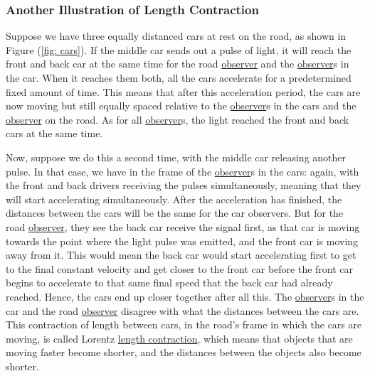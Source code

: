 \subsubsection{Another Illustration of Length Contraction}

Suppose we have three equally distanced cars at rest on the road, as shown in Figure (\ref{fig: cars}).
If the middle car sends out a pulse of light, it will reach the front and back car at the same time for the road \hyperlink{def-observer}{observer} and the \hyperlink{def-observer}{observer}s in the car. When it reaches them both, all the cars accelerate for a predetermined fixed amount of time.
This means that after this acceleration period, the cars are now moving but still equally spaced relative to the \hyperlink{def-observer}{observer}s in the cars and the \hyperlink{def-observer}{observer} on the road.
As for all \hyperlink{def-observer}{observer}s, the light reached the front and back cars at the same time.

Now, suppose we do this a second time, with the middle car releasing another pulse.
In that case, we have in the frame of the \hyperlink{def-observer}{observer}s in the cars: again, with the front and back drivers receiving the pulses simultaneously, meaning that they will start accelerating simultaneously.
After the acceleration has finished, the distances between the cars will be the same for the car observers.
But for the road \hyperlink{def-observer}{observer}, they see the back car receive the signal first, as that car is moving towards the point where the light pulse was emitted, and the front car is moving away from it.
This would mean the back car would start accelerating first to get to the final constant velocity and get closer to the front car before the front car begins to accelerate to that same final speed that the back car had already reached.
Hence, the cars end up closer together after all this.
The \hyperlink{def-observer}{observer}s in the car and the road \hyperlink{def-observer}{observer} disagree with what the distances between the cars are.
This contraction of length between cars, in the road's frame in which the cars are moving, is called Lorentz \hyperlink{def-length-contraction}{length contraction}, which means that objects that are moving faster become shorter, and the distances between the objects also become shorter.

